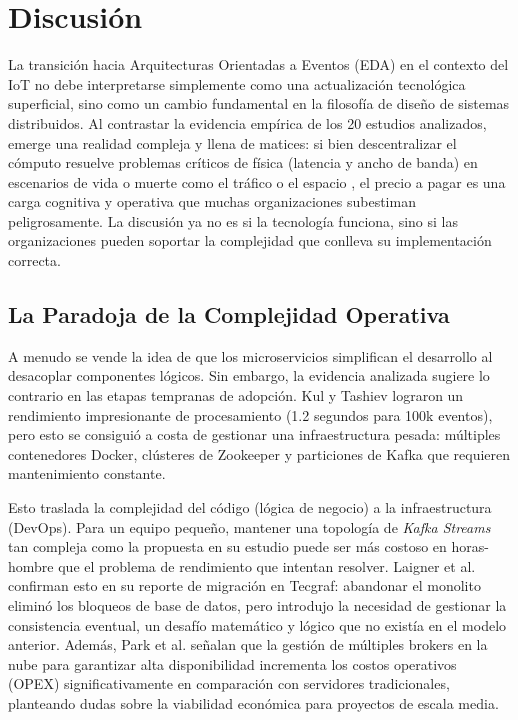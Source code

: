 \section{Discusión}

La transición hacia Arquitecturas Orientadas a Eventos (EDA) en el contexto del IoT no debe interpretarse simplemente como una actualización tecnológica superficial, sino como un cambio fundamental en la filosofía de diseño de sistemas distribuidos. Al contrastar la evidencia empírica de los 20 estudios analizados, emerge una realidad compleja y llena de matices: si bien descentralizar el cómputo resuelve problemas críticos de física (latencia y ancho de banda) en escenarios de vida o muerte como el tráfico o el espacio \cite{perera2024traffic, coretti2025neuromorphic}, el precio a pagar es una carga cognitiva y operativa que muchas organizaciones subestiman peligrosamente. La discusión ya no es si la tecnología funciona, sino si las organizaciones pueden soportar la complejidad que conlleva su implementación correcta.

\subsection{La Paradoja de la Complejidad Operativa}
A menudo se vende la idea de que los microservicios simplifican el desarrollo al desacoplar componentes lógicos. Sin embargo, la evidencia analizada sugiere lo contrario en las etapas tempranas de adopción. Kul y Tashiev \cite{kul2021microservices} lograron un rendimiento impresionante de procesamiento (1.2 segundos para 100k eventos), pero esto se consiguió a costa de gestionar una infraestructura pesada: múltiples contenedores Docker, clústeres de Zookeeper y particiones de Kafka que requieren mantenimiento constante.

Esto traslada la complejidad del código (lógica de negocio) a la infraestructura (DevOps). Para un equipo pequeño, mantener una topología de \textit{Kafka Streams} tan compleja como la propuesta en su estudio puede ser más costoso en horas-hombre que el problema de rendimiento que intentan resolver. Laigner et al. \cite{laigner2020monolithic} confirman esto en su reporte de migración en Tecgraf: abandonar el monolito eliminó los bloqueos de base de datos, pero introdujo la necesidad de gestionar la consistencia eventual, un desafío matemático y lógico que no existía en el modelo anterior. Además, Park et al. \cite{park2021cloud} señalan que la gestión de múltiples brokers en la nube para garantizar alta disponibilidad incrementa los costos operativos (OPEX) significativamente en comparación con servidores tradicionales, planteando dudas sobre la viabilidad económica para proyectos de escala media.

